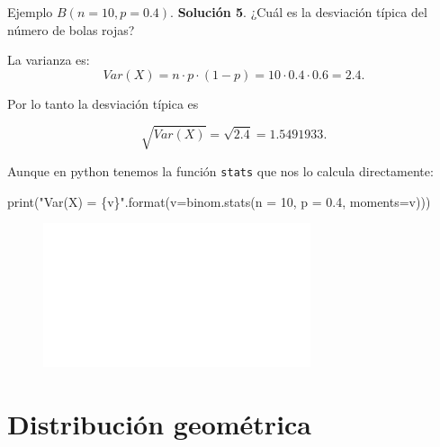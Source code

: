 \documentclass[
  ignorenonframetext,
  aspectratio=169]{beamer}
\newenvironment{Shaded}{\begin{snugshade}}{\end{snugshade}}
\newcommand{\BuiltInTok}[1]{\textcolor[rgb]{0.00,0.23,0.31}{#1}}
\newcommand{\DecValTok}[1]{\textcolor[rgb]{0.68,0.00,0.00}{#1}}
\newcommand{\FloatTok}[1]{\textcolor[rgb]{0.68,0.00,0.00}{#1}}
\newcommand{\NormalTok}[1]{\textcolor[rgb]{0.00,0.23,0.31}{#1}}
\newcommand{\OperatorTok}[1]{\textcolor[rgb]{0.37,0.37,0.37}{#1}}
\newcommand{\SpecialCharTok}[1]{\textcolor[rgb]{0.37,0.37,0.37}{#1}}
\newcommand{\StringTok}[1]{\textcolor[rgb]{0.13,0.47,0.30}{#1}}
\begin{document}
\begin{frame}[fragile]{Ejemplo \(B(n=10,p=0.4).\)}
\protect\hypertarget{ejemplo-bn10p0.4.-7}{}
\textbf{Solución 5}. ¿Cuál es la desviación típica del número de bolas
rojas?

La varianza es: \[
Var(X)=n\cdot p \cdot(1-p)=10\cdot 0.4\cdot 0.6=2.4.
\]

Por lo tanto la desviación típica es

\[\sqrt{Var(X)}=\sqrt{2.4}= 1.5491933.\]

Aunque en python tenemos la función \texttt{stats} que nos lo calcula
directamente:

\begin{Shaded}
\begin{Highlighting}[]
\BuiltInTok{print}\NormalTok{(}\StringTok{"Var(X) = }\SpecialCharTok{\{v\}}\StringTok{"}\NormalTok{.}\BuiltInTok{format}\NormalTok{(v}\OperatorTok{=}\NormalTok{binom.stats(n }\OperatorTok{=} \DecValTok{10}\NormalTok{, p }\OperatorTok{=} \FloatTok{0.4}\NormalTok{, moments}\OperatorTok{=}\StringTok{\textquotesingle{}v\textquotesingle{}}\NormalTok{)))}
\end{Highlighting}
\end{Shaded}

\begin{figure}

{\centering \includegraphics[width=0.7\textwidth,height=\textheight]{Tema_3_1_Notables_files/figure-beamer/unnamed-chunk-17-3.pdf}

}

\end{figure}
\end{frame}

\hypertarget{distribuciuxf3n-geomuxe9trica}{%
\section{Distribución geométrica}\label{distribuciuxf3n-geomuxe9trica}}
\end{document}
